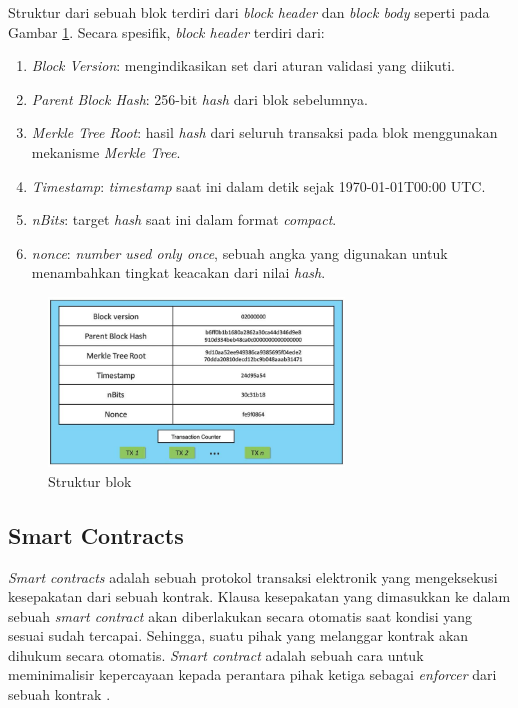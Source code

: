 \break

Struktur dari sebuah blok terdiri dari \textit{block header} dan \textit{block body} seperti pada Gambar \ref{image:struktur-blok}. Secara spesifik, \textit{block header} terdiri dari:

\begin{enumerate}
	\item \textit{Block Version}: mengindikasikan set dari aturan validasi yang diikuti.
	\item \textit{Parent Block Hash}: 256-bit \textit{hash} dari blok sebelumnya.
	\item \textit{Merkle Tree Root}: hasil \textit{hash} dari seluruh transaksi pada blok menggunakan mekanisme \textit{Merkle Tree}.
	\item \textit{Timestamp}: \textit{timestamp} saat ini dalam detik sejak 1970-01-01T00:00 UTC.
	\item \textit{nBits}: target \textit{hash} saat ini dalam format \textit{compact}.
	\item \textit{nonce}: \textit{number used only once}, sebuah angka yang digunakan untuk menambahkan tingkat keacakan dari nilai \textit{hash}.
\end{enumerate}

\begin{figure}
	\centering
	\includegraphics[width=0.7\textwidth]{resources/chapter-2/struktur-block.png}
	\caption{Struktur blok \parencite{zheng2018blockchain}}
	\label{image:struktur-blok}
\end{figure}

\subsection{Smart Contracts}
\label{subsec:smart-contracts}

\textit{Smart contracts} adalah sebuah protokol transaksi elektronik yang mengeksekusi kesepakatan dari sebuah kontrak. Klausa kesepakatan yang dimasukkan ke dalam sebuah \textit{smart contract} akan diberlakukan secara otomatis saat kondisi yang sesuai sudah tercapai. Sehingga, suatu pihak yang melanggar kontrak akan dihukum secara otomatis. \textit{Smart contract} adalah sebuah cara untuk meminimalisir kepercayaan kepada perantara pihak ketiga sebagai \textit{enforcer} dari sebuah kontrak \parencite{szabo1997formalizing}.

